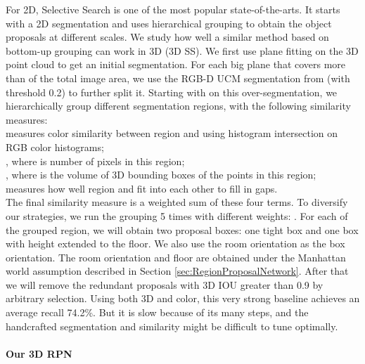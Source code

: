 \documentclass[10pt,twocolumn,letterpaper]{article}
\begin{document}
For 2D, Selective Search \cite{SelectiveSearch} is one of the most popular state-of-the-arts.
It starts with a 2D segmentation and uses hierarchical grouping to obtain the object proposals at different scales. 
We study how well a similar method based on bottom-up grouping can work in 3D (3D SS).
We first use plane fitting on the 3D point cloud to get an initial segmentation.
For each big plane that covers more than  of the total image area,
we use the RGB-D UCM segmentation from \cite{depthRCNN} (with threshold 0.2) to further split it. 
Starting with on this over-segmentation, we hierarchically group \cite{SelectiveSearch} different segmentation regions,
with the following similarity measures: \\
{
\small
{ \small{}} measures color similarity between region  and  using histogram intersection on RGB color histograms;\\
{ \small{}}, where  is number of pixels in this region;\\
{ \small{}}, where  is the volume of 3D bounding boxes of the points in this region;\\
{ \small{}} measures how well region  and  fit into each other to fill in gaps.\\
}
The final similarity measure is a weighted sum of these four terms.
To diversify our strategies, we run the grouping 5 times with different weights:     .
For each of the grouped region, we will obtain two proposal boxes: one tight box and one box with height extended to the floor. 
We also use the room orientation as the box orientation. 
The room orientation and floor are obtained under the Manhattan world assumption described in Section \ref{sec:RegionProposalNetwork}.
After that we will remove the redundant proposals with 3D IOU greater than 0.9 by arbitrary selection.
Using both 3D and color, this very strong baseline achieves an average recall 74.2\%. 
But it is slow because of its many steps, 
and the handcrafted segmentation and similarity might be difficult to tune optimally.



\vspace{-4mm}\paragraph{Our 3D RPN}
\end{document}
